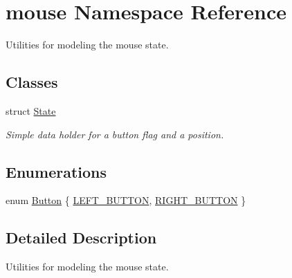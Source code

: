 \hypertarget{namespacemouse}{\section{mouse Namespace Reference}
\label{namespacemouse}
}


Utilities for modeling the mouse state.  


\subsection*{Classes}
\begin{DoxyCompactItemize}
\item 
struct \hyperlink{structmouse_1_1_state}{State}
\begin{DoxyCompactList}\small\item\em Simple data holder for a button flag and a position. \end{DoxyCompactList}\end{DoxyCompactItemize}
\subsection*{Enumerations}
\begin{DoxyCompactItemize}
\item 
enum \hyperlink{namespacemouse_af85c842f9410a5f81fe933360fb19bc4}{Button} \{ \hyperlink{namespacemouse_af85c842f9410a5f81fe933360fb19bc4ad099c4586c3d6cf30e4d4da38bc414ca}{L\-E\-F\-T\-\_\-\-B\-U\-T\-T\-O\-N}, 
\hyperlink{namespacemouse_af85c842f9410a5f81fe933360fb19bc4a9ab944e0c7a1999da316be044705f024}{R\-I\-G\-H\-T\-\_\-\-B\-U\-T\-T\-O\-N}
 \}
\end{DoxyCompactItemize}


\subsection{Detailed Description}
Utilities for modeling the mouse state. 

